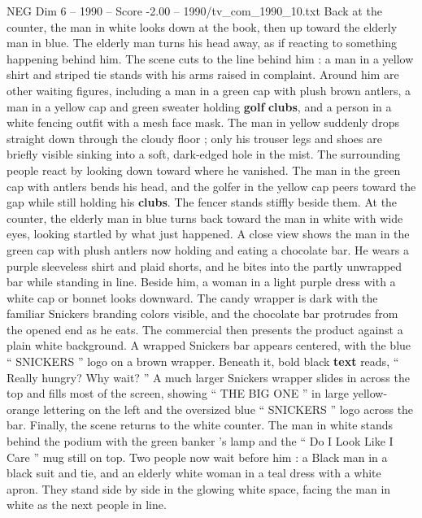 \begin{textsample}{NEG Dim 6 – 1990 – Score -2.00 – 1990/tv\_com\_1990\_10.txt}
Back at the counter, the man in white looks down at the book, then up toward the elderly man in blue.
The elderly man turns his head away, as if reacting to something happening behind him.
The scene cuts to the line behind him : a man in a yellow shirt and striped tie stands with his arms raised in complaint.
Around him are other waiting figures, including a man in a green cap with plush brown antlers, a man in a yellow cap and green sweater holding \textbf{golf} \textbf{clubs}, and a person in a white fencing outfit with a mesh face mask.
The man in yellow suddenly drops straight down through the cloudy floor ; only his trouser legs and shoes are briefly visible sinking into a soft, dark-edged hole in the mist.
The surrounding people react by looking down toward where he vanished.
The man in the green cap with antlers bends his head, and the golfer in the yellow cap peers toward the gap while still holding his \textbf{clubs}.
The fencer stands stiffly beside them.
At the counter, the elderly man in blue turns back toward the man in white with wide eyes, looking startled by what just happened.
A close view shows the man in the green cap with plush antlers now holding and eating a chocolate bar.
He wears a purple sleeveless shirt and plaid shorts, and he bites into the partly unwrapped bar while standing in line.
Beside him, a woman in a light purple dress with a white cap or bonnet looks downward.
The candy wrapper is dark with the familiar Snickers branding colors visible, and the chocolate bar protrudes from the opened end as he eats.
The commercial then presents the product against a plain white background.
A wrapped Snickers bar appears centered, with the blue “ SNICKERS ” logo on a brown wrapper.
Beneath it, bold black \textbf{text} reads, “ Really hungry?
Why wait? ” A much larger Snickers wrapper slides in across the top and fills most of the screen, showing “ THE BIG ONE ” in large yellow-orange lettering on the left and the oversized blue “ SNICKERS ” logo across the bar.
Finally, the scene returns to the white counter.
The man in white stands behind the podium with the green banker ’s lamp and the “ Do I Look Like I Care ” mug still on top.
Two people now wait before him : a Black man in a black suit and tie, and an elderly white woman in a teal dress with a white apron.
They stand side by side in the glowing white space, facing the man in white as the next people in line.

\end{textsample}
